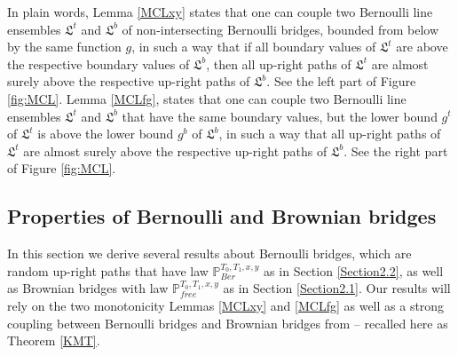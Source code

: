 In plain words, Lemma \ref{MCLxy} states that one can couple two Bernoulli line ensembles $\mathfrak{L}^{t}$ and $\mathfrak{L}^{b}$ of non-intersecting Bernoulli bridges, bounded from below by the same function $g$, in such a way that if all boundary values of $\mathfrak{L}^{t}$ are above the respective boundary values of $\mathfrak{L}^{b}$, then all up-right paths of $\mathfrak{L}^{t}$ are almost surely above the respective up-right paths of $\mathfrak{L}^{b}$. See the left part of Figure \ref{fig:MCL}. Lemma \ref{MCLfg}, states that one can couple two Bernoulli line ensembles $\mathfrak{L}^{t}$ and $\mathfrak{L}^{b}$ that have the same boundary values, but the lower bound $g^t$ of $\mathfrak{L}^{t}$ is above the lower bound $g^b$ of $\mathfrak{L}^{b}$, in such a way that all up-right paths of $\mathfrak{L}^{t}$ are almost surely above the respective up-right paths of $\mathfrak{L}^{b}$. See the right part of Figure \ref{fig:MCL}.


%
\subsection{Properties of Bernoulli and Brownian bridges}\label{Section3.2} In this section we derive several results about Bernoulli bridges, which are random up-right paths that have law $\mathbb{P}_{Ber}^{T_0, T_1, x,y}$ as in Section \ref{Section2.2}, as well as Brownian bridges with law $\mathbb{P}^{T_0,T_1,x,y}_{free}$ as in Section \ref{Section2.1}. Our results will rely on the two monotonicity Lemmas \ref{MCLxy} and \ref{MCLfg} as well as a strong coupling between Bernoulli bridges and Brownian bridges from \cite{CD} -- recalled here as Theorem \ref{KMT}.

